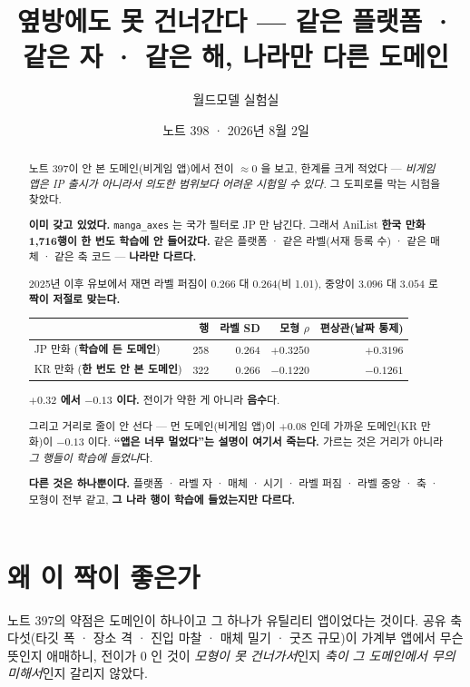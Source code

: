 \documentclass[11pt]{article}
\begin{document}
\title{옆방에도 못 건너간다 --- 같은 플랫폼 · 같은 자 · 같은 해, 나라만 다른 도메인}
\author{월드모델 실험실}
\date{노트 398 · 2026년 8월 2일}
\maketitle

\begin{abstract}
노트 397이 안 본 도메인(비게임 앱)에서 전이 $\approx 0$ 을 보고, 한계를
크게 적었다 --- \emph{비게임 앱은 IP 출시가 아니라서 의도한 범위보다
어려운 시험일 수 있다.} 그 도피로를 막는 시험을 찾았다.

\textbf{이미 갖고 있었다.} \texttt{manga\_axes} 는 국가 필터로 JP 만
남긴다. 그래서 AniList \textbf{한국 만화 1,716행이 한 번도 학습에 안
들어갔다.} 같은 플랫폼 · 같은 라벨(서재 등록 수) · 같은 매체 · 같은 축
코드 --- \textbf{나라만 다르다.}

2025년 이후 유보에서 재면 라벨 퍼짐이 $0.266$ 대 $0.264$(비 1.01), 중앙이
$3.096$ 대 $3.054$ 로 \textbf{짝이 저절로 맞는다.}

\begin{center}
\begin{tabular}{lrrrr}
\hline
 & 행 & 라벨 SD & 모형 $\rho$ & 편상관(날짜 통제) \\
\hline
JP 만화 (\textbf{학습에 든 도메인}) & 258 & 0.264 & $+0.3250$ & $\mathbf{+0.3196}$ \\
KR 만화 (\textbf{한 번도 안 본 도메인}) & 322 & 0.266 & $-0.1220$ & $\mathbf{-0.1261}$ \\
\hline
\end{tabular}
\end{center}

\textbf{$+0.32$ 에서 $-0.13$ 이다.} 전이가 약한 게 아니라 \textbf{음수}다.

그리고 거리로 줄이 안 선다 --- 먼 도메인(비게임 앱)이 $+0.08$ 인데
가까운 도메인(KR 만화)이 $-0.13$ 이다. \textbf{``앱은 너무 멀었다''는
설명이 여기서 죽는다.} 가르는 것은 거리가 아니라 \emph{그 행들이 학습에
들었나}다.

\textbf{다른 것은 하나뿐이다.} 플랫폼 · 라벨 자 · 매체 · 시기 · 라벨 퍼짐 ·
라벨 중앙 · 축 · 모형이 전부 같고, \textbf{그 나라 행이 학습에 들었는지만
다르다.}
\end{abstract}

\section{왜 이 짝이 좋은가}

노트 397의 약점은 도메인이 하나이고 그 하나가 유틸리티 앱이었다는 것이다.
공유 축 다섯(타깃 폭 · 장소 격 · 진입 마찰 · 매체 밀기 · 굿즈 규모)이
가계부 앱에서 무슨 뜻인지 애매하니, 전이가 0 인 것이 \emph{모형이 못
건너가서}인지 \emph{축이 그 도메인에서 무의미해서}인지 갈리지 않았다.
\end{document}
